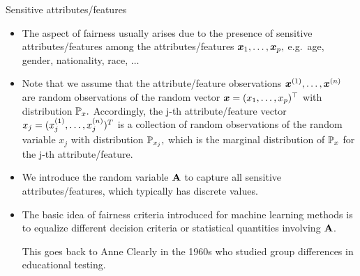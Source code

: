 \begin{vbframe}{Sensitive attributes/features}
	\small{
		\begin{itemize}
%			
			\item The aspect of fairness usually arises due to the presence of sensitive attributes/features among the attributes/features  $\bm{x}_1, \ldots, \bm{x}_p,$ e.g.\ age, gender, nationality, race, $\ldots$
%			
			\item Note that we assume that the attribute/feature observations $\bm{x}^{(1)},\ldots,\bm{x}^{(n)}$ are random observations of the random vector $\bm{x}=(x_1,\ldots,x_p)^\top$ with distribution $\mathbb{P}_{x}.$ Accordingly, the j-th attribute/feature vector $x_j = (x^{(1)}_j, \ldots, x^{(n)}_j)^T$ is a collection of random observations of the random variable $x_j$ with distribution $\mathbb{P}_{x_j},$ which is the marginal distribution of $\mathbb{P}_{x}$ for the j-th attribute/feature.
%
			\item We introduce the random variable $\mathbf{A}$ to capture all sensitive attributes/features, which typically has discrete values.
%			
			\item The basic idea of fairness criteria introduced for machine learning methods is to equalize different decision criteria or statistical quantities  involving $\mathbf{A}$.
%			

			\scriptsize{This goes back to Anne Clearly in the 1960s who studied group differences in educational testing.}
%			
		\end{itemize}
	}
\end{vbframe}


